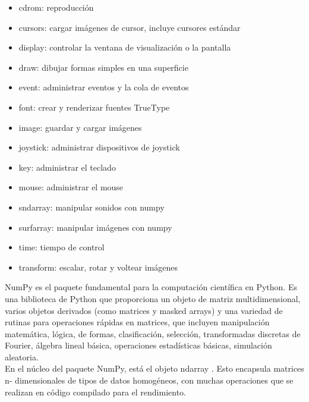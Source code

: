 \documentclass[12pt,letterpaper]{article}
\begin{document}
\begin{itemize}
    \item cdrom: reproducción
    \item cursors: cargar imágenes de cursor, incluye cursores estándar
    \item display: controlar la ventana de visualización o la pantalla
    \item draw: dibujar formas simples en una superficie
    \item event: administrar eventos y la cola de eventos
    \item font: crear y renderizar fuentes TrueType
    \item image: guardar y cargar imágenes
    \item joystick: administrar dispositivos de joystick
    \item key: administrar el teclado
    \item mouse: administrar el mouse
    \item sndarray: manipular sonidos con numpy
    \item surfarray: manipular imágenes con numpy
    \item time: tiempo de control
    \item transform: escalar, rotar y voltear imágenes

\end{itemize}

NumPy es el paquete fundamental para la computación científica en Python. Es una biblioteca de Python que proporciona un objeto de matriz multidimensional, varios objetos derivados (como matrices y masked arrays) y una variedad de rutinas para operaciones rápidas en matrices, que incluyen manipulación matemática, lógica, de formas, clasificación, selección, transformadas discretas de Fourier, álgebra lineal básica, operaciones estadísticas básicas, simulación aleatoria.\vspace{5mm}\\
\indent En el núcleo del paquete NumPy, está el objeto ndarray . Esto encapsula matrices n- dimensionales de tipos de datos homogéneos, con muchas operaciones que se realizan en código compilado para el rendimiento.
\end{document}
